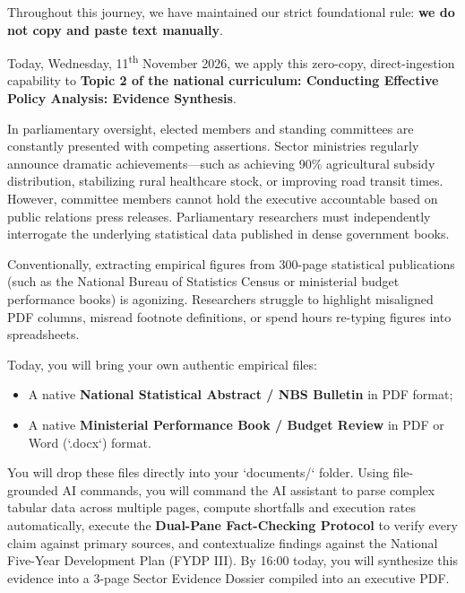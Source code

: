 \documentclass[11pt, a4paper]{report}
\begin{document}
Throughout this journey, we have maintained our strict foundational rule: \textcolor{suagreen}{\textbf{we do not copy and paste text manually}}.

Today, Wednesday, 11\textsuperscript{th} November 2026, we apply this zero-copy, direct-ingestion capability to \textcolor{tanzaniablue}{\textbf{Topic 2 of the national curriculum: Conducting Effective Policy Analysis: Evidence Synthesis}}.

In parliamentary oversight, elected members and standing committees are constantly presented with competing assertions. Sector ministries regularly announce dramatic achievements---such as achieving 90\% agricultural subsidy distribution, stabilizing rural healthcare stock, or improving road transit times. However, committee members cannot hold the executive accountable based on public relations press releases. Parliamentary researchers must independently interrogate the underlying statistical data published in dense government books.

Conventionally, extracting empirical figures from 300-page statistical publications (such as the National Bureau of Statistics Census or ministerial budget performance books) is agonizing. Researchers struggle to highlight misaligned PDF columns, misread footnote definitions, or spend hours re-typing figures into spreadsheets.

Today, you will bring your own authentic empirical files:
\begin{itemize}[label=-]
    \item A native \textcolor{suagreen}{\textbf{National Statistical Abstract / NBS Bulletin}} in PDF format;
    \item A native \textcolor{tanzaniablue}{\textbf{Ministerial Performance Book / Budget Review}} in PDF or Word (`.docx`) format.
\end{itemize}

You will drop these files directly into your `documents/` folder. Using file-grounded AI commands, you will command the AI assistant to parse complex tabular data across multiple pages, compute shortfalls and execution rates automatically, execute the \textcolor{suagreen}{\textbf{Dual-Pane Fact-Checking Protocol}} to verify every claim against primary sources, and contextualize findings against the National Five-Year Development Plan (FYDP III). By 16:00 today, you will synthesize this evidence into a 3-page Sector Evidence Dossier compiled into an executive PDF.
\end{document}
